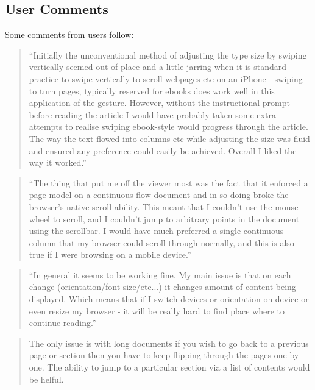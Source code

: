 \subsection{User Comments}
Some comments from users follow:

{\raggedright
\begin{quote}
``Initially the unconventional method of adjusting the type size by swiping vertically seemed out of place and a little jarring when it is standard practice to swipe vertically to scroll webpages etc on an iPhone - swiping to turn pages, typically reserved for ebooks does work well in this application of the gesture. However, without the instructional prompt before reading the article I would have probably taken some extra attempts to realise swiping ebook-style would progress through the article. The way the text flowed into columns etc while adjusting the size was fluid and ensured any preference could easily be achieved. Overall I liked the way it worked.''
\end{quote}

\begin{quote}
``The thing that put me off the viewer most was the fact that it enforced a page model on a continuous flow document and in so doing broke the browser's native scroll ability. This meant that I couldn't use the mouse wheel to scroll, and I couldn't jump to arbitrary points in the document using the scrollbar. I would have much preferred a single continuous column that my browser could scroll through normally, and this is also true if I were browsing on a mobile device.''
\end{quote}

\begin{quote}
``In general it seems to be working fine. My main issue is that on each change (orientation/font size/etc...) it changes amount of content being displayed. Which means that if I switch devices or orientation on device or even resize my browser - it will be really hard to find place where to continue reading.''
\end{quote}

\begin{quote}
The only issue is with long documents if you wish to go back to a previous page or section then you have to keep flipping through the pages one by one. The ability to jump to a particular section via a list of contents would be helful.
\end{quote}


}

